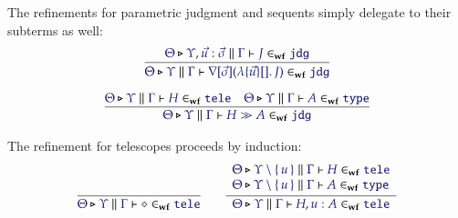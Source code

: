 \documentclass[11pt]{article}
\theoremstyle{definition}
\theoremstyle{remark}
\numberwithin{equation}{section}
\newcommand\IsWf[5]{%
  \IMode{#1}\triangleright%
  \IMode{#2}\parallel%
  \IMode{#3}\vdash%
  \IMode{#4}\in_{\mathbf{wf}}\IMode{#5}%
}
\begin{document}
The refinements for parametric judgment and sequents simply delegate to their
subterms as well:
\begin{gather*}
  \infer{
    \IsWf{\Theta}{\Upsilon}{\Gamma}{
      \App{\OpNabla{\vec{\sigma}}}{
        \MkBTm{\vec{u}}{}{J}
      }
    }{\SortJdg}
  }{
    \IsWf{\Theta}{\Upsilon,\vec{u}:\vec{\sigma}}{\Gamma}{J}{\SortJdg}
  }
\\[6pt]
  \infer{
    \IsWf{\Theta}{\Upsilon}{\Gamma}{
      H\gg A
    }{\SortJdg}
  }{
    \IsWf{\Theta}{\Upsilon}{\Gamma}{H}{\SortTele}
&
    \IsWf{\Theta}{\Upsilon}{\Gamma}{A}{\SortType}
  }
\end{gather*}

The refinement for telescopes proceeds by induction:
\begin{gather*}
  \infer{
    \IsWf{\Theta}{\Upsilon}{\Gamma}{\diamond}{\SortTele}
  }{
  }
\qquad
  \infer{
    \IsWf{\Theta}{\Upsilon}{\Gamma}{H,u:A}{\SortTele}
  }{
    \begin{array}{l}
      \IsWf{\Theta}{\Upsilon\setminus\MkSet{u}}{\Gamma}{H}{\SortTele}
\\
      \IsWf{\Theta}{\Upsilon\setminus\MkSet{u}}{\Gamma}{A}{\SortType}
    \end{array}
  }
\end{gather*}

\ifdraft{}{
  \nocite{*}
  
  
}
\end{document}
